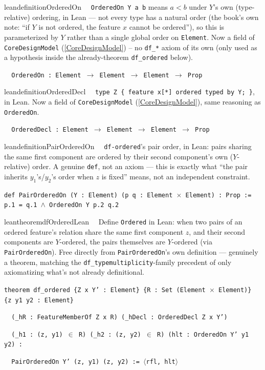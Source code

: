\begin{restatable}{leandefinition}{OrderedOn}~~ \texttt{OrderedOn Y a b} means $a<b$ under
$Y$'s own (type-relative) ordering, in Lean --- not every type has a natural order (the book's own note: ``if
$Y$ is not ordered, the feature $x$ cannot be ordered''), so this is parameterized by $Y$ rather than a single
global order on \texttt{Element}. Now a field of \texttt{CoreDesignModel} (\ref{CoreDesignModel}) -- no
\texttt{df\_*} axiom of its own (only used as a hypothesis inside the already-theorem \texttt{df\_ordered}
below).

\texttt{~~OrderedOn : Element $\to$ Element $\to$ Element $\to$ Prop}
\label{OrderedOn}
\end{restatable}

\begin{restatable}{leandefinition}{OrderedDecl}~~ \texttt{type Z \{ feature x[*] ordered
typed by Y; \}}, in Lean. Now a field of \texttt{CoreDesignModel} (\ref{CoreDesignModel}), same reasoning as
\texttt{OrderedOn}.

\texttt{~~OrderedDecl : Element $\to$ Element $\to$ Element $\to$ Prop}
\label{OrderedDecl}
\end{restatable}

\begin{restatable}{leandefinition}{PairOrderedOn}~~ \texttt{df-ordered}'s pair order,
in Lean: pairs sharing the same first component are ordered by their second component's own ($Y$-relative)
order. A genuine \texttt{def}, not an axiom --- this is exactly what ``the pair inherits $y_1$'s/$y_2$'s order
when $z$ is fixed'' means, not an independent constraint.

\texttt{\textcolor{leancolor}{def} \textcolor{leanyellow}{PairOrderedOn} (Y : Element) (p q : Element $\times$ Element) : Prop := p.1 = q.1 $\wedge$ OrderedOn Y p.2 q.2}
\label{PairOrderedOn}
\end{restatable}

\begin{restatable}{leantheorem}{dfOrderedLean}~~ Define \texttt{Ordered} in Lean: when
two pairs of an ordered feature's relation share the same first component $z$, and their second components
are $Y$-ordered, the pairs themselves are $Y$-ordered (via \texttt{PairOrderedOn}). Free directly from
\texttt{PairOrderedOn}'s own definition --- genuinely a theorem, matching the
\texttt{df\_typemultiplicity}-family precedent of only axiomatizing what's not already definitional.

\texttt{\textcolor{leancolor}{theorem} \textcolor{leanyellow}{df\_ordered} \{Z x Y' : Element\} \{R : Set (Element $\times$ Element)\} \{z y1 y2 : Element\}}

\texttt{~~(\_hR : FeatureMemberOf Z x R) (\_hDecl : OrderedDecl Z x Y')}

\texttt{~~(\_h1 : (z, y1) $\in$ R) (\_h2 : (z, y2) $\in$ R) (hlt : OrderedOn Y' y1 y2) :}

\texttt{~~PairOrderedOn Y' (z, y1) (z, y2) := $\langle$rfl, hlt$\rangle$}
\label{df_ordered}
\end{restatable}

